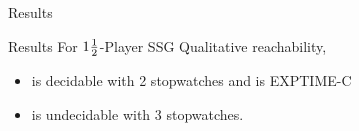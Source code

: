 \documentclass{beamer}
\begin{document}
        \begin{frame}{Results}
          \begin{block}{Results}
            For $1\frac{1}{2}$-Player SSG Qualitative reachability,
            \begin{itemize}
 \item         is decidable with 2 stopwatches and is EXPTIME-C
 \item    is undecidable with 3 stopwatches.
   \end{itemize}
          \end{block}



           \end{frame}
\end{document}
